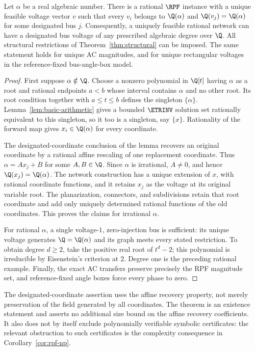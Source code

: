 \begin{theorem}
\label{thm:algebraic-degree}
Let $\alpha$ be a real algebraic number. There is a rational $\RPF$
instance with a unique feasible voltage vector $v$ such that every $v_i$
belongs to $\Q(\alpha)$ and $\Q(v_j)=\Q(\alpha)$ for some designated bus
$j$. Consequently, a uniquely feasible rational network can have a designated
bus voltage of any prescribed algebraic degree over $\Q$.
All structural restrictions of Theorem~\ref{thm:structural} can be imposed.
The same statement holds for unique AC magnitudes, and for unique rectangular
voltages in the reference-fixed bus-angle-box model.
\end{theorem}
\begin{proof}
First suppose $\alpha\notin\Q$. Choose a nonzero polynomial in $\Q[t]$
having $\alpha$ as a root and rational endpoints $a<b$ whose interval
contains $\alpha$ and no other root. Its root condition together with
$a\le t\le b$ defines the singleton $\{\alpha\}$.
Lemma~\ref{lem:basic-arithmetic} gives a bounded $\ETRINV$
solution set rationally equivalent to this singleton, so it too is a
singleton, say $\{x\}$. Rationality of the forward map gives
$x_i\in\Q(\alpha)$ for every coordinate.

The designated-coordinate conclusion of the lemma recovers an original
coordinate by a rational affine rescaling of one replacement coordinate. Thus
$\alpha=A x_j+B$ for some $A,B\in\Q$. Since $\alpha$ is irrational,
$A\ne0$, and hence $\Q(x_j)=\Q(\alpha)$.
The network construction has a unique extension of $x$, with rational
coordinate functions, and it retains $x_j$ as the voltage at its original
variable root. The planarization, connectors, and subdivisions retain that
root coordinate and add only uniquely determined rational functions of the
old coordinates. This proves the claims for irrational $\alpha$.

For rational $\alpha$, a single voltage-$1$, zero-injection bus is sufficient:
its unique voltage generates $\Q=\Q(\alpha)$ and its graph meets every
stated restriction. To obtain degree $d\ge2$, take the positive real root
of $t^d-2$; this polynomial is irreducible by Eisenstein's criterion at $2$.
Degree one is the preceding rational example. Finally, the exact AC transfers
preserve precisely the RPF magnitude set, and reference-fixed angle boxes
force every phase to zero.
\end{proof}

The designated-coordinate assertion uses the affine recovery property,
not merely preservation of the field generated by all coordinates. The
theorem is an existence statement and asserts no additional size bound on
the affine recovery coefficients. It also does not by itself exclude
polynomially verifiable symbolic certificates: the relevant obstruction to
such certificates is the complexity consequence in
Corollary~\ref{cor:rpf-np}.
